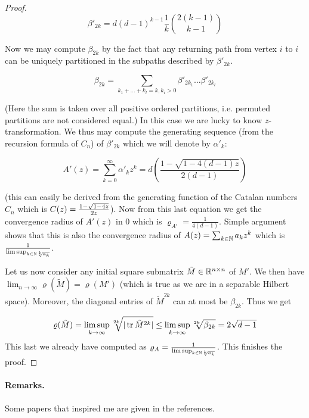\documentclass{article}
\begin{document}
\begin{proof}
\begin{equation}
\beta'_{2k}=d(d-1)^{k-1}\frac{1}{k}{2(k-1) \choose k-1}
\end{equation}

Now we may compute $\beta_{2k}$ by the fact that any returning path from vertex $i$ to $i$ can be uniquely partitioned in the subpaths described by $\beta'_{2k}$.

\begin{equation}
\beta_{2k} = \sum_{k_1+\ldots+k_l=k, k_i>0}{\beta'_{2k_1}\ldots\beta'_{2k_l}}\label{eq4}
\end{equation}

(Here the sum is taken over all positive ordered partitions, i.e. permuted partitions are not considered equal.)
In this case we are lucky to know $z$-transformation.
We thus may compute the generating sequence (from the recursion formula of $C_n$) of $\beta'_{2k}$ which we will denote by $\alpha'_k$:

\begin{equation}
A'(z) = \sum_{k=0}^{\infty} \alpha'_kz^k =d\left(\frac{1-\sqrt{1-4(d-1)z}}{2(d-1)}\right)
\end{equation}

(this can easily be derived from the generating function of the Catalan numbers $C_n$ which is $C(z)={\small\frac{1-\sqrt{1-4z}}{2z}}$). Now from this last equation we get the convergence radius of $A'(z)$ in 0 which is $\varrho_{A'}=\frac{1}{4(d-1)}$. Simple argument shows that this is also the convergence radius of $A(z)=\sum_{k\in\mathbb{N}}{a_kz^k}$ which is $\frac{1}{\limsup_{k\in\mathbb{N}\sqrt[k]{a_k}}}$.

Let us now consider any initial square submatrix $\tilde{M}\in\mathbb{R}^{n\times n}$ of $M'$. We then have $\lim_{n\to\infty}\varrho(\tilde{M})=\varrho(M')$ (which is true as we are in a separable Hilbert space). Moreover, the diagonal entries of $\tilde{M}^{2k}$ can at most be $\beta_{2k}$. Thus we get

\begin{equation}
\varrho(\tilde{M}) =\limsup_{k\to\infty} \sqrt[2k]{|\operatorname{tr}{\tilde{M}^{2k}}|}\leq \limsup_{k\to\infty}{\sqrt[2k]{\beta_{2k}}}=2\sqrt{d-1}
\end{equation}
This last we already have computed as $\varrho_{A} = \frac{1}{\limsup_{k\in\mathbb{N}\sqrt[k]{a_k}}}$. This finishes the proof. 
\end{proof}

\paragraph{Remarks.} Some papers that inspired me are given in the references.

%
\nocite{*}
 

\end{document}
